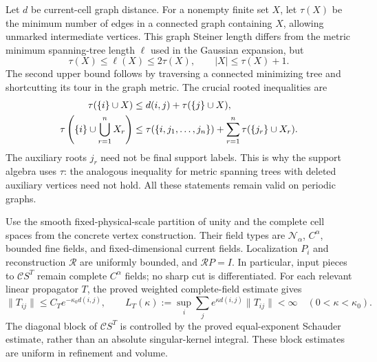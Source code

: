 Let $d$ be current-cell graph distance. For a nonempty finite set $X$,
let $\tau(X)$ be the minimum number of edges in a connected graph
containing $X$, allowing unmarked intermediate vertices. This graph
Steiner length differs from the metric minimum spanning-tree length
$\ell$ used in the Gaussian expansion, but
\begin{equation}
 \tau(X)\le\ell(X)\le2\tau(X),\qquad |X|\le\tau(X)+1.       \label{cl-metric-comparison}
\end{equation}
The second upper bound follows by traversing a connected minimizing
tree and shortcutting its tour in the graph metric. The crucial rooted
inequalities are
\begin{align}
 \tau(\{i\}\cup X)&\le d(i,j)+\tau(\{j\}\cup X),\notag\\
 \tau\left(\{i\}\cup\bigcup_{r=1}^nX_r\right)
 &\le\tau(\{i,j_1,\ldots,j_n\})
                         +\sum_{r=1}^n\tau(\{j_r\}\cup X_r).
                                                               \label{cl-root-gluing}
\end{align}
The auxiliary roots $j_r$ need not be final support labels. This is why
the support algebra uses $\tau$: the analogous inequality for metric
spanning trees with deleted auxiliary vertices need not hold. All these
statements remain valid on periodic graphs.

Use the smooth fixed-physical-scale partition of unity and the complete
cell spaces from the concrete vertex construction. Their field types
are $\mathcal N_\alpha$, $C^\alpha$, bounded fine fields, and
fixed-dimensional current fields. Localization $P_i$ and reconstruction
$\mathcal R$ are uniformly bounded, and $\mathcal R P=I$.
In particular, input pieces to $\mathcal C S^T$ remain complete
$C^\alpha$ fields; no sharp cut is differentiated. For each relevant
linear propagator $T$, the proved weighted complete-field estimate gives
\begin{equation}
 \|T_{ij}\|\le C_Te^{-\kappa_0d(i,j)},\qquad
 L_T(\kappa):=\sup_i\sum_j e^{\kappa d(i,j)}\|T_{ij}\|<\infty
 \quad(0<\kappa<\kappa_0).                                  \label{cl-linear-blocks}
\end{equation}
The diagonal block of $\mathcal C S^T$ is controlled by the proved
equal-exponent Schauder estimate, rather than an absolute singular-kernel
integral. These block estimates are uniform in refinement and volume.


